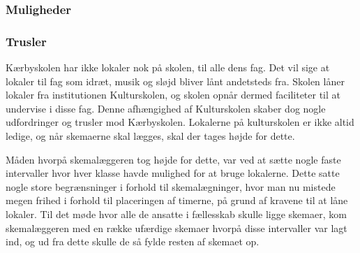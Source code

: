 \subsubsection*{Muligheder}


\subsubsection*{Trusler}
Kærbyskolen har ikke lokaler nok på skolen, til alle dens fag. Det vil sige at lokaler til fag som idræt, musik og sløjd bliver lånt andetsteds fra. Skolen låner lokaler fra institutionen Kulturskolen, og skolen opnår dermed faciliteter til at undervise i disse fag. Denne afhængighed af Kulturskolen skaber dog nogle udfordringer og trusler mod Kærbyskolen. Lokalerne på kulturskolen er ikke altid ledige, og når skemaerne skal lægges, skal der tages højde for dette. 

Måden hvorpå skemalæggeren tog højde for dette, var ved at sætte nogle faste intervaller hvor hver klasse havde mulighed for at bruge lokalerne. Dette satte nogle store begrænsninger i forhold til skemalægninger, hvor man nu mistede megen frihed i forhold til placeringen af timerne, på grund af kravene til at låne lokaler. Til det møde hvor alle de ansatte i fællesskab skulle ligge skemaer, kom skemalæggeren med en række ufærdige skemaer hvorpå disse intervaller var lagt ind, og ud fra dette skulle de så fylde resten af skemaet op. 